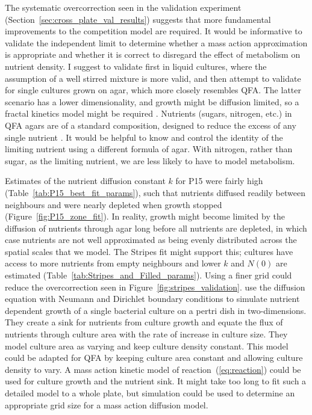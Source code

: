 The systematic overcorrection seen in the validation experiment
(Section~\ref{sec:cross_plate_val_results}) suggests that more
fundamental improvements to the competition model are required. It
would be informative to validate the independent limit to determine
whether a mass action approximation is appropriate and whether it is
correct to disregard the effect of metabolism on nutrient density. I
suggest to validate first in liquid cultures, where the assumption of
a well stirred mixture is more valid, and then attempt to validate for
single cultures grown on agar, which more closely resembles QFA. The
latter scenario has a lower dimensionality, and growth might be
diffusion limited, so a fractal kinetics model might be required
\citep{Kopelman1988,savageau1995}. Nutrients (sugars, nitrogen, etc.)
in QFA agars are of a standard composition, designed to reduce the
excess of any single nutrient \citep{Addinall2011}. It would be
helpful to know and control the identity of the limiting nutrient
using a different formula of agar. With nitrogen, rather than sugar,
as the limiting nutrient, we are less likely to have to model
metabolism.

Estimates of the nutrient diffusion constant \(k\) for P15 were fairly
high (Table~\ref{tab:P15_best_fit_params}), such that nutrients
diffused readily between neighbours and were nearly depleted when
growth stopped (Figure~\ref{fig:P15_zone_fit}). In reality, growth
might become limited by the diffusion of nutrients through agar long
before all nutrients are depleted, in which case nutrients are not
well approximated as being evenly distributed across the spatial
scales that we model. The Stripes fit might support this; cultures
have access to more nutrients from empty neighbours and lower \(k\)
and \(N(0)\) are estimated
(Table~\ref{tab:Stripes_and_Filled_params}). Using a finer grid could
reduce the overcorrection seen in
Figure~\ref{fig:stripes_validation}.
\citet{Reo2014} use the diffusion equation with Neumann and Dirichlet
boundary conditions to simulate nutrient dependent growth of a single
bacterial culture on a pertri dish in two-dimensions. They create a
sink for nutrients from culture growth and equate the flux of
nutrients through culture area with the rate of increase in culture
size. They model culture area as varying and keep culture density
constant. This model could be adapted for QFA by keeping culture area
constant and allowing culture density to vary. A mass action kinetic
model of reaction~(\ref{eq:reaction}) could be used for culture growth
and the nutrient sink. It might take too long to fit such a detailed
model to a whole plate, but simulation could be used to determine an
appropriate grid size for a mass action diffusion model.

